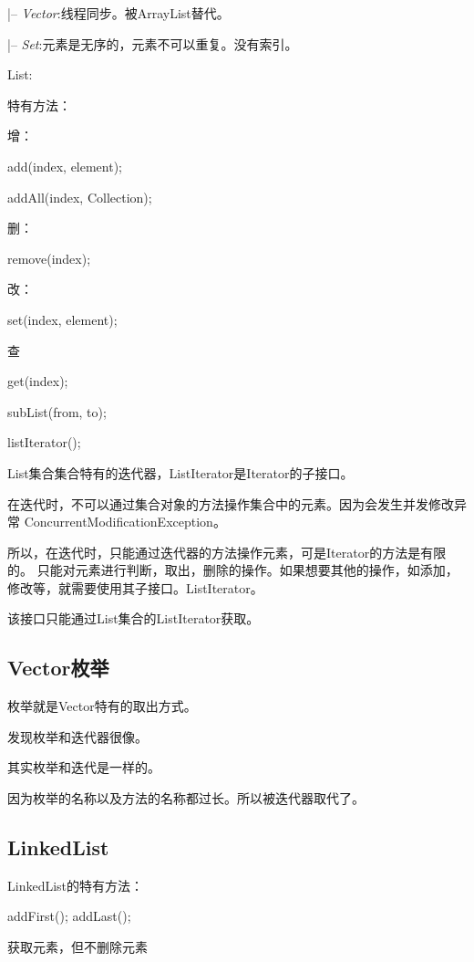 \documentclass[UTF8]{ctexart}
\begin{document}
\qquad \qquad |-- \textit{Vector}:线程同步。被ArrayList替代。

\qquad |-- \textit{Set}:元素是无序的，元素不可以重复。没有索引。

List: 

特有方法：

增：

add(index, element);

addAll(index, Collection);

删：

remove(index);

改：

set(index, element);

查

get(index);

subList(from, to);

listIterator();

List集合集合特有的迭代器，ListIterator是Iterator的子接口。

在迭代时，不可以通过集合对象的方法操作集合中的元素。因为会发生并发修改异常
ConcurrentModificationException。

所以，在迭代时，只能通过迭代器的方法操作元素，可是Iterator的方法是有限的。
只能对元素进行判断，取出，删除的操作。如果想要其他的操作，如添加，修改等，就需要使用其子接口。ListIterator。

该接口只能通过List集合的ListIterator获取。



\subsection{Vector枚举}

枚举就是Vector特有的取出方式。

发现枚举和迭代器很像。

其实枚举和迭代是一样的。

因为枚举的名称以及方法的名称都过长。所以被迭代器取代了。



\subsection{LinkedList}

LinkedList的特有方法：

addFirst();
addLast();

获取元素，但不删除元素
\end{document}
